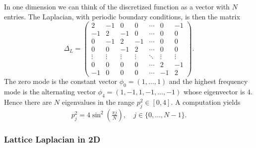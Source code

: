 \documentclass[12pt]{article}
\begin{document}
In one dimension we can think of the discretized function as a vector
with $N$ entries. The Laplacian, with periodic boundary conditions, is
then the matrix
\begin{equation}
  \Delta_L = 
  \left(
    \begin{smallmatrix}
      2 & -1 & 0 & 0 & \cdots & 0 & -1 \\
      -1 & 2 & -1 & 0 & \cdots & 0 & 0 \\
      0 & -1 & 2 & -1 & \cdots & 0 & 0 \\
      0 & 0 & -1 & 2 & \cdots & 0 & 0 \\
      \vdots & \vdots & \vdots & \vdots & \ddots & \vdots & \vdots \\
      0 & 0 & 0 & 0 & \cdots & 2 & -1 \\
      -1 & 0 & 0 & 0 & \cdots & -1 & 2
    \end{smallmatrix}
  \right).
\end{equation}
The zero mode is the constant vector $\phi_0 = (1, \dots, 1)$ and the
highest frequency mode is the alternating vector $\phi_4 = (1, -1, 1,
-1, \dots, -1)$ whose eigenvector is $4$. Hence there are $N$
eigenvalues in the range $p_j^2 \in [0,4]$. A computation yields
\begin{equation}
  p_j^2 = 4 \sin^2\left(\tfrac{\pi j}{N}\right)
  ,\quad
  j \in \{0, \dots, N-1\}.
\end{equation}


\subsubsection{Lattice Laplacian in 2D}
\end{document}
